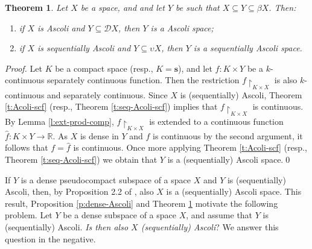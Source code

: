 \documentclass[preprint,11pt]{elsarticle}
\newtheorem{theorem}{Theorem}[section]
\numberwithin{equation}{section}
\numberwithin{theorem}{section}
\newcommand{\IR}{\mathbb{R}}
\newcommand{\DD}{\mathcal{D}}
\newcommand{\SM}{{\setminus}}
\begin{document}
\begin{theorem} \label{t:completion-Ascoli}
Let $X$ be a space, and and let $Y$ be such that $X\subseteq Y\subseteq \beta X$. Then:
\begin{enumerate}
\item[{\rm(i)}] if $X$ is Ascoli and $Y\subseteq \DD X$, then  $Y$ is a Ascoli space;
\item[{\rm(ii)}] if $X$ is sequentially Ascoli  and $Y\subseteq \upsilon X$, then $Y$ is a  sequentially Ascoli space.
\end{enumerate}
\end{theorem}

\begin{proof}
Let $K$ be a compact space (resp., $K=\mathbf{s}$), and let $f:K\times Y$ be a $k$-continuous separately continuous function. Then the restriction $f{\restriction}_{K\times X}$ is also $k$-continuous and separately continuous. Since $X$ is (sequentially) Ascoli, Theorem \ref{t:Acoli-scf} (resp., Theorem \ref{t:seq-Acoli-scf}) implies that $f{\restriction}_{K\times X}$ is continuous. By Lemma \ref{l:ext-prod-comp}, $f{\restriction}_{K\times X}$  is extended to a continuous function $\hat f:K\times Y\to\IR$. As $X$ is dense in $Y$ and $f$ is continuous by the second argument, it follows that $f=\hat f$ is continuous. Once more applying Theorem \ref{t:Acoli-scf} (resp., Theorem \ref{t:seq-Acoli-scf}) we obtain that $Y$ is a (sequentially) Ascoli space.\qed
\end{proof}




If $Y$ is a dense pseudocompact subspace of a space $X$ and $Y$ is (sequentially) Ascoli, then, by Proposition 2.2 of \cite{Gabr-pseudo-Ascoli},   also $X$ is a (sequentially) Ascoli space. This result, Proposition \ref{p:dense-Ascoli} and Theorem \ref{t:completion-Ascoli} motivate the following problem.
Let $Y$ be a dense subspace of a space $X$, and assume that $Y$ is (sequentially) Ascoli. {\em Is then also $X$ (sequentially) Ascoli}?
We answer this question in the negative.
\end{document}

